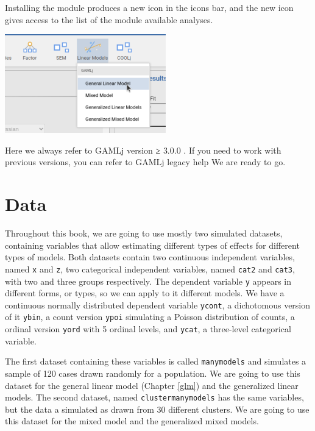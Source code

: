 \documentclass[
]{book}
\begin{document}
Installing the module produces a new icon in the icons bar, and the new icon gives access to the list of the module available analyses.

\includegraphics[width=0.9\linewidth]{bookletpics/0_menu1}

Here we always refer to { { GAMLj version ≥ } 3.0.0 }. If you need to work with previous versions, you can refer to GAMLj legacy help
We are ready to go.

\hypertarget{data}{%
\section{Data}\label{data}}

Throughout this book, we are going to use mostly two simulated datasets, containing variables that allow estimating different types of effects for different types of models. Both datasets contain two continuous independent variables, named \texttt{x} and \texttt{z}, two categorical independent variables, named \texttt{cat2} and \texttt{cat3}, with two and three groups respectively. The dependent variable \texttt{y} appears in different forms, or types, so we can apply to it different models. We have a continuous normally distributed dependent variable \texttt{ycont}, a dichotomous version of it \texttt{ybin}, a count version \texttt{ypoi} simulating a Poisson distribution of counts, a ordinal version \texttt{yord} with 5 ordinal levels, and \texttt{ycat}, a three-level categorical variable.

The first dataset containing these variables is called \texttt{manymodels} and simulates a sample of 120 cases drawn randomly for a population. We are going to use this dataset for the general linear model (Chapter \ref{glm}) and the generalized linear models. The second dataset, named \texttt{clustermanymodels} has the same variables, but the data a simulated as drawn from 30 different clusters. We are going to use this dataset for the mixed model and the generalized mixed models.
\end{document}

